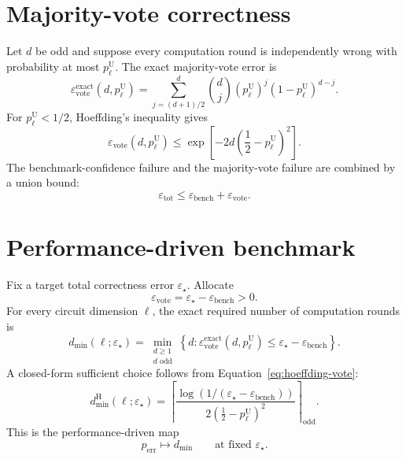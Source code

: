 \documentclass[11pt]{article}
\newcommand{\eps}{\varepsilon}
\newcommand{\ceilodd}[1]{\left\lceil #1 \right\rceil_{\mathrm{odd}}}
\begin{document}
\section{Majority-vote correctness}

Let $d$ be odd and suppose every computation round is independently wrong with
probability at most $p_\ell^{\mathrm U}$. The exact majority-vote error is
\begin{equation}
  \eps_{\mathrm{vote}}^{\mathrm{exact}}
  (d,p_\ell^{\mathrm U})
  =\sum_{j=(d+1)/2}^{d}
    \binom{d}{j}
    (p_\ell^{\mathrm U})^j
    (1-p_\ell^{\mathrm U})^{d-j}.
  \label{eq:exact-tail}
\end{equation}
For $p_\ell^{\mathrm U}<1/2$, Hoeffding's inequality gives
\begin{equation}
  \eps_{\mathrm{vote}}(d,p_\ell^{\mathrm U})
  \le
  \exp\!\left[-2d\left(\frac12-p_\ell^{\mathrm U}\right)^2\right].
  \label{eq:hoeffding-vote}
\end{equation}
The benchmark-confidence failure and the majority-vote failure are combined by
a union bound:
\begin{equation}
  \eps_{\mathrm{tot}}
  \le \eps_{\mathrm{bench}}+\eps_{\mathrm{vote}}.
  \label{eq:total-epsilon}
\end{equation}

\section{Performance-driven benchmark}

Fix a target total correctness error $\eps_\star$. Allocate
\begin{equation}
  \eps_{\mathrm{vote}}
  =\eps_\star-\eps_{\mathrm{bench}}>0.
\end{equation}
For every circuit dimension $\ell$, the exact required number of computation
rounds is
\begin{equation}
  d_{\min}(\ell;\eps_\star)
  =\min_{\substack{d\ge1\\ d\text{ odd}}}
  \left\{
    d:\eps_{\mathrm{vote}}^{\mathrm{exact}}
    (d,p_\ell^{\mathrm U})
    \le \eps_\star-\eps_{\mathrm{bench}}
  \right\}.
  \label{eq:dmin-exact}
\end{equation}
A closed-form sufficient choice follows from Equation~\eqref{eq:hoeffding-vote}:
\begin{equation}
  d_{\min}^{\mathrm H}(\ell;\eps_\star)
  =\ceilodd{
    \frac{\log\!\left(1/(\eps_\star-\eps_{\mathrm{bench}})\right)}
    {2\left(\frac12-p_\ell^{\mathrm U}\right)^2}
  }.
  \label{eq:dmin-hoeffding}
\end{equation}
This is the performance-driven map
\begin{equation}
  p_{\mathrm{err}}\longmapsto d_{\min}
  \qquad\text{at fixed }\eps_\star.
\end{equation}
\end{document}
